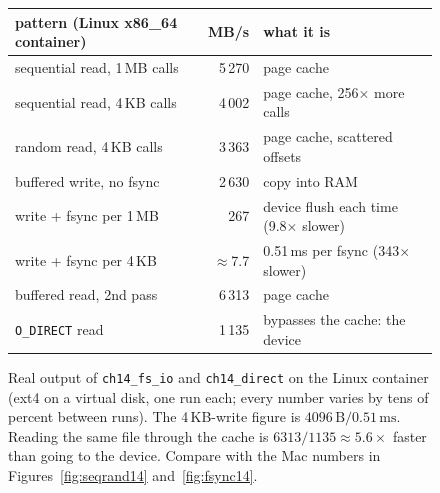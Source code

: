 \begin{figure}[htbp]
\centering
\begin{tabular}{lrl}
\toprule
pattern (Linux x86\_64 container) & MB/s & what it is \\
\midrule
sequential read, 1\,MB calls & 5\,270 & page cache \\
sequential read, 4\,KB calls & 4\,002 & page cache, 256$\times$ more calls \\
random read, 4\,KB calls & 3\,363 & page cache, scattered offsets \\
buffered write, no fsync & 2\,630 & copy into RAM \\
write + fsync per 1\,MB & 267 & device flush each time (9.8$\times$ slower) \\
write + fsync per 4\,KB & $\approx$7.7 & 0.51\,ms per fsync (343$\times$ slower) \\
\midrule
buffered read, 2nd pass & 6\,313 & page cache \\
\texttt{O\_DIRECT} read & 1\,135 & bypasses the cache: the device \\
\bottomrule
\end{tabular}
\caption{Real output of \texttt{ch14\_fs\_io} and \texttt{ch14\_direct}
on the Linux container (ext4 on a virtual disk, one run each; every
number varies by tens of percent between runs). The 4\,KB-write
figure is $4096\,\text{B}/0.51\,\text{ms}$. Reading the same file
through the cache is $6313/1135\approx5.6\times$ faster than going to
the device. Compare with the Mac numbers in
Figures~\ref{fig:seqrand14} and~\ref{fig:fsync14}.}
\label{fig:linuxio14}
\end{figure}
